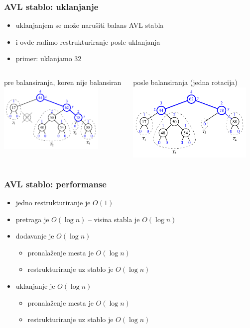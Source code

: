 \documentclass[compress]{beamer}
\begin{document}
\begin{frame}[fragile]
  \frametitle{AVL stablo: uklanjanje}
  \begin{itemize}
    \item uklanjanjem se može narušiti balans AVL stabla
    \item i ovde radimo restrukturiranje posle uklanjanja
    \item primer: uklanjamo 32
  \end{itemize}
  \begin{columns}
    \begin{column}[t]{6cm}
      \begin{center}
        pre balansiranja, koren nije balansiran 
        \includegraphics[width=5cm]{asp-11-pic17a.pdf}
      \end{center}
    \end{column}  
    \begin{column}[t]{6cm}
      \begin{center}
        posle balansiranja (jedna rotacija)
        \includegraphics[width=6cm]{asp-11-pic17b.pdf}
      \end{center}
    \end{column}  
  \end{columns}
\end{frame}

\begin{frame}[fragile]
  \frametitle{AVL stablo: performanse}
  \begin{itemize}
    \item jedno restrukturiranje je $O(1)$ 
    \item pretraga je $O(\log n)$ -- visina stabla je $O(\log n)$
    \item dodavanje je $O(\log n)$
    \begin{itemize}
      \item pronalaženje mesta je $O(\log n)$
      \item restrukturiranje uz stablo je $O(\log n)$
    \end{itemize}
    \item uklanjanje je $O(\log n)$
    \begin{itemize}
      \item pronalaženje mesta je $O(\log n)$
      \item restrukturiranje uz stablo je $O(\log n)$
    \end{itemize}
  \end{itemize}
\end{frame}
\end{document}
